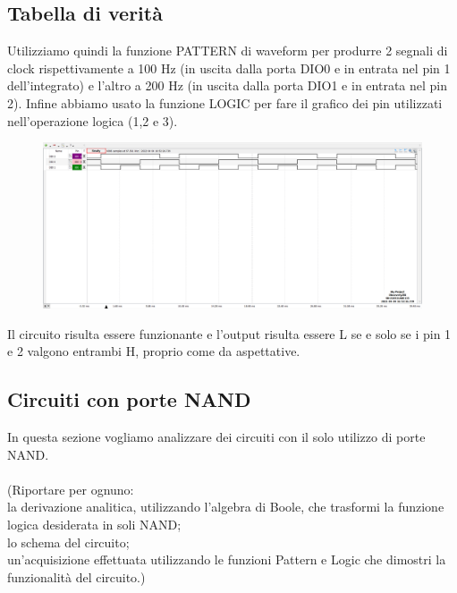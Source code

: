 \documentclass[10pt, a4paper, italian]{article}
\begin{document}
\subsection{Tabella di verità}
Utilizziamo quindi la funzione PATTERN di waveform per produrre 2 segnali di clock rispettivamente a 100 Hz (in uscita dalla porta DIO0 e in entrata nel pin 1 dell'integrato) e l'altro a 200 Hz (in uscita dalla porta DIO1 e in entrata nel pin 2). Infine abbiamo usato la funzione LOGIC per fare il grafico dei pin utilizzati nell'operazione logica (1,2 e 3). 
\begin{figure}
	\includegraphics[scale=0.4]{nand_time}
	\label{nand_time}
\end{figure}
Il circuito risulta essere funzionante e l'output risulta essere L se e solo se i pin 1 e 2 valgono entrambi H, proprio come da aspettative.
\subsection{Circuiti con porte NAND}
In questa sezione vogliamo analizzare dei circuiti con il solo utilizzo di porte NAND.\\
\\
(Riportare per ognuno:\\
la derivazione analitica, utilizzando l'algebra di Boole, che trasformi la funzione logica desiderata in soli NAND;\\
lo schema del circuito;\\
un'acquisizione effettuata utilizzando le funzioni Pattern e Logic che dimostri la funzionalità del circuito.)
\end{document}
